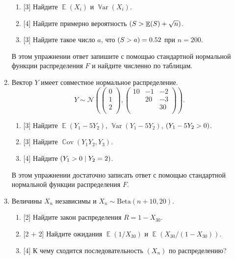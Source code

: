 \documentclass[12pt]{article}
\DeclareMathOperator{\Cov}{\mathbb{C}ov}
\DeclareMathOperator{\Var}{\mathbb{V}ar}
\let\P\relax
\DeclareMathOperator{\P}{\mathbb{P}}
\DeclareMathOperator{\E}{\mathbb{E}}
\newcommand \cN{\mathcal{N}}
\newcommand{\dBeta}{\mathrm{Beta}}
\begin{document}
\begin{enumerate}
    \begin{enumerate}
        \item {[3]} Найдите $\E(X_i)$ и $\Var(X_i)$.
        \item {[4]} Найдите примерно вероятность $\P(S > \E(S) +  \sqrt{n} )$.
        \item {[3]} Найдите такое число $a$, что $\P(S > a) = 0.52$ при $n = 200$. 
    \end{enumerate}

    В этом упражнении ответ запишите с помощью стандартной нормальной функции распределения $F$ и найдите численно по таблицам.

    \item Вектор $Y$ имеет совместное нормальное распределение. 
    \[
    Y \sim \cN\left( \begin{pmatrix}
        0 \\
        1 \\
        2 \\
    \end{pmatrix}, 
    \begin{pmatrix}
        10 & -1 & -2 \\
         & 20 & -3 \\
         & & 30 \\
    \end{pmatrix}
    \right).
    \]
\begin{enumerate}
    \item {[3]} Найдите $\E(Y_1 - 5Y_2)$, $\Var(Y_1 - 5Y_2)$, $\P(Y_1 - 5Y_2 > 0)$.
    \item {[3]} Найдите $\Cov(Y_1 Y_2, Y_3)$.
    \item {[4]} Найдите $\P(Y_1 > 0 \mid Y_2 = 2)$.
\end{enumerate}    

В этом упражнении достаточно записать ответ с помощью стандартной нормальной функции распределения $F$.

\item Величины $X_n$ независимы и $X_n \sim \dBeta(n + 10, 20)$.

\begin{enumerate}
    \item {[2]} Найдите закон распределения $R = 1 - X_{30}$.
    \item {[2 + 2]} Найдите ожидания $\E(1/X_{30})$ и $\E(X_{30} / (1 - X_{30}))$.
    \item {[4]} К чему сходится последовательность $(X_n)$ по распределению?
\end{enumerate}



\end{enumerate}
\end{document}
